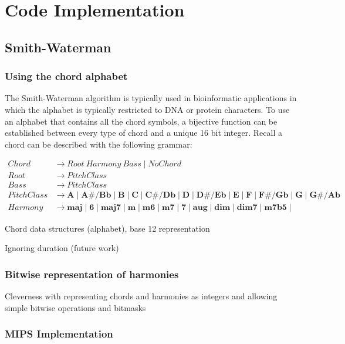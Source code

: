 \chapter{Code Implementation}

\section{Smith-Waterman}

\subsection{Using the chord alphabet}

The Smith-Waterman algorithm is typically used in bioinformatic applications in which the alphabet is typically restricted to DNA or protein characters. To use an alphabet that contains all the chord symbols, a bijective function can be established between every type of chord and a unique 16 bit integer. Recall a chord can be described with the following grammar:

\begin{align*}
Chord &\to Root\ Harmony \ Bass \mid NoChord \\
Root &\to PitchClass \\
Bass &\to PitchClass \\
PitchClass &\to \bm{A} \mid \bm{A\#/Bb} \mid \bm{B} \mid \bm{C} \mid \bm{C\#/Db} \mid \bm{D} \mid \bm{D\#/Eb} \mid \bm{E} \mid \bm{F} \mid \bm{F\#/Gb} \mid \bm{G} \mid \bm{G\#/Ab} \\
Harmony &\to \bm{maj} \mid \bm{6} \mid \bm{maj7} \mid \bm{m} \mid \bm{m6} \mid \bm{m7} \mid \bm{7} \mid \bm{aug} \mid \bm{dim} \mid \bm{dim7} \mid \bm{m7b5} \mid \end{align*}

\item Chord data structures (alphabet), base 12 representation

\item Ignoring duration (future work)

\subsection{Bitwise representation of harmonies}

\item Cleverness with representing chords and harmonies as integers and allowing simple bitwise operations and bitmasks

\subsection{MIPS Implementation}

